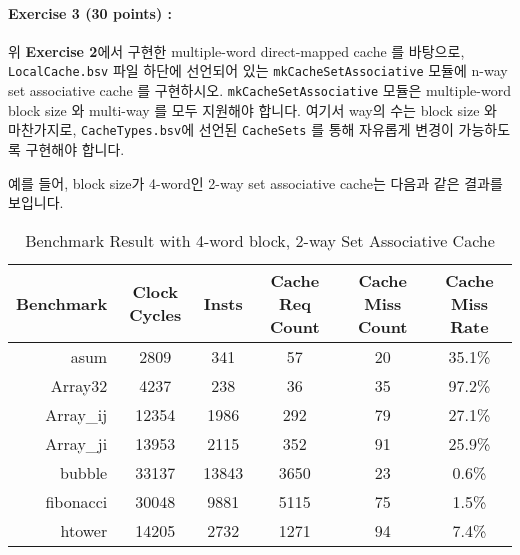 \documentclass{article}
\begin{document}
\noindent \paragraph{\bf Exercise 3 (30 points) :} 
위 \textbf{Exercise 2}에서 구현한 multiple-word direct-mapped cache 를 바탕으로,
\texttt{LocalCache.bsv} 파일 하단에 선언되어 있는 \texttt{mkCacheSetAssociative} 모듈에
n-way set associative cache 를 구현하시오.
\texttt{mkCacheSetAssociative} 모듈은 multiple-word block size 와 multi-way 를 모두 지원해야 합니다.
여기서 way의 수는 block size 와 마찬가지로, \texttt{CacheTypes.bsv}에 선언된 \texttt{CacheSets} 를 통해 
자유롭게 변경이 가능하도록 구현해야 합니다.

예를 들어, block size가 4-word인 2-way set associative cache는 다음과 같은 결과를 보입니다.

\begin{table}[ht]
\centering
\begin{tabular}{|r|c|c|c|c|c|}
\hline
Benchmark & Clock Cycles & Insts & Cache Req Count & Cache Miss Count & Cache Miss Rate \\
\hline
asum & 2809 & 341 & 57 & 20 & 35.1\% \\
Array32 & 4237 & 238 & 36 & 35 & 97.2\% \\
Array\_ij & 12354 & 1986 & 292 & 79 & 27.1\% \\
Array\_ji & 13953 & 2115 & 352 & 91 & 25.9\% \\
bubble & 33137 & 13843 & 3650 & 23 & 0.6\% \\
fibonacci & 30048 & 9881 & 5115 & 75 & 1.5\% \\
htower & 14205 & 2732 & 1271 & 94 & 7.4\% \\
\hline
\end{tabular}
\caption{Benchmark Result with 4-word block, 2-way Set Associative Cache}
\end{table}
\end{document}
